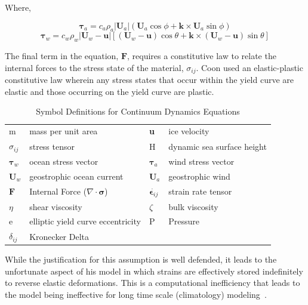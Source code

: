 Where,

\begin{equation}
\boldsymbol{\tau}_a = c_a\rho_a|\mathbf{U}_a|(\mathbf{U}_a\cos{\phi}+\mathbf{k} \times \mathbf{U}_a\sin{\phi})
\label{eq:Hibler_Wind_Stress}
\end{equation}
\begin{equation}
\boldsymbol{\tau}_w = c_w\rho_w|\mathbf{U}_w-\mathbf{u}|[(\mathbf{U}_w-\mathbf{u})\cos{\theta}+\textbf{k} \times (\mathbf{U}_w-\mathbf{u})\sin{\theta}]
\label{eq:Hibler_Current_Stress}
\end{equation}

The final term in the equation, $\mathbf{F}$, requires a constitutive law to relate the internal forces to the stress state of the material, $\sigma_{ij}$.  Coon used an elastic-plastic constitutive law wherein any stress states that occur within the yield curve are elastic and those occurring on the yield curve are plastic.

\begin{table}
[H]
\caption{Symbol Definitions for Continuum Dynamics Equations}
\centering
\begin{tabular}{llll}
\hline
m & mass per unit area & \textbf{u} & ice velocity\\
$\sigma_{ij}$ & stress tensor & H & dynamic sea surface height\\
$\boldsymbol{\tau}_w$ & ocean stress vector & $\boldsymbol{\tau}_a$ & wind stress vector\\
$\textbf{U}_w$ & geostrophic ocean current & $\textbf{U}_a$ & geostrophic wind\\
$\textbf{F}$ & Internal Force ($\nabla\cdot\mathbf{\sigma}$) & $\dot{\mathbf{\epsilon}_{ij}}$ & strain rate tensor\\
$\eta$ & shear viscosity & $\zeta$ & bulk viscosity\\
e & elliptic yield curve eccentricity & P & Pressure\\
$\delta_{ij}$ & Kronecker Delta & & \\
\hline
\end{tabular}
\label{table:Continuum_Definitions}
\end{table}

While the justification for this assumption is well defended, it leads to the unfortunate aspect of his model in which strains are effectively stored indefinitely to reverse elastic deformations.  This is a computational inefficiency that leads to the model being ineffective for long time scale (climatology) modeling~\citet{Hibler1979}.

